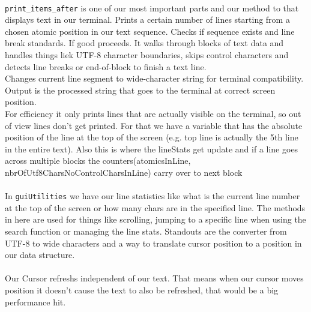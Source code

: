 \noindent
\\\verb|print_items_after| is one of our most important parts and our method to that displays text in our terminal. Prints a certain number of lines starting from a chosen atomic position in our text sequence.
Checks if sequence exists and line break standards. If good proceeds. It walks through blocks of text data and handles things liek UTF-8 character boundaries, skips control characters and detects line breaks or end-of-block to finish a text line.
\\Changes current line segment to wide-character string for terminal compatibility.
Output is the processed string that goes to the terminal at correct screen position.
\\For efficiency it only prints lines that are actually visible on the terminal, so out of view lines don't get printed. For that we have a variable that has the absolute position of the line at the top of the screen (e.g. top line is actually the 5th line in the entire text).
Also this is where the lineStats get update and if a line goes across multiple blocks the counters(atomicsInLine, nbrOfUtf8CharsNoControlCharsInLine) carry over to next block
\\
\\In \verb|guiUtilities| we have our line statistics like what is the current line number at the top of the screen or how many chars are in the specified line. The methods in here are used for things like scrolling, jumping to a specific line when using the search function or managing the line stats.
Standouts are the converter from UTF-8 to wide characters and a way to translate cursor position to a position in our data structure.
\\
\\Our Cursor refreshs independent of our text. That means when our cursor moves position it doesn't cause the text to also be refreshed, that would be a big performance hit.